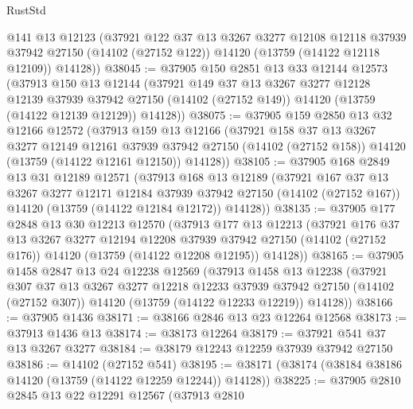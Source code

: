 \begin{lexlean}{RustStd}
\begin{coremodule}
      @141
      @13
      @12123
      (@37921
        @122
        @37
        @13
        @3267
        @3277
        @12108
        @12118
        @37939
        @37942
        @27150
        (@14102 (@27152 @122))
        @14120
        (@13759 (@14122 @12118 @12109))
        @14128))
@38045 := @37905
    @150
    @2851
    @13
    @33
    @12144
    @12573
    (@37913
      @150
      @13
      @12144
      (@37921
        @149
        @37
        @13
        @3267
        @3277
        @12128
        @12139
        @37939
        @37942
        @27150
        (@14102 (@27152 @149))
        @14120
        (@13759 (@14122 @12139 @12129))
        @14128))
@38075 := @37905
    @159
    @2850
    @13
    @32
    @12166
    @12572
    (@37913
      @159
      @13
      @12166
      (@37921
        @158
        @37
        @13
        @3267
        @3277
        @12149
        @12161
        @37939
        @37942
        @27150
        (@14102 (@27152 @158))
        @14120
        (@13759 (@14122 @12161 @12150))
        @14128))
@38105 := @37905
    @168
    @2849
    @13
    @31
    @12189
    @12571
    (@37913
      @168
      @13
      @12189
      (@37921
        @167
        @37
        @13
        @3267
        @3277
        @12171
        @12184
        @37939
        @37942
        @27150
        (@14102 (@27152 @167))
        @14120
        (@13759 (@14122 @12184 @12172))
        @14128))
@38135 := @37905
    @177
    @2848
    @13
    @30
    @12213
    @12570
    (@37913
      @177
      @13
      @12213
      (@37921
        @176
        @37
        @13
        @3267
        @3277
        @12194
        @12208
        @37939
        @37942
        @27150
        (@14102 (@27152 @176))
        @14120
        (@13759 (@14122 @12208 @12195))
        @14128))
@38165 := @37905
    @1458
    @2847
    @13
    @24
    @12238
    @12569
    (@37913
      @1458
      @13
      @12238
      (@37921
        @307
        @37
        @13
        @3267
        @3277
        @12218
        @12233
        @37939
        @37942
        @27150
        (@14102 (@27152 @307))
        @14120
        (@13759 (@14122 @12233 @12219))
        @14128))
@38166 := @37905 @1436
@38171 := @38166 @2846 @13 @23 @12264 @12568
@38173 := @37913 @1436 @13
@38174 := @38173 @12264
@38179 := @37921 @541 @37 @13 @3267 @3277
@38184 := @38179 @12243 @12259 @37939 @37942 @27150
@38186 := @14102 (@27152 @541)
@38195 := @38171 (@38174 (@38184 @38186 @14120 (@13759 (@14122 @12259 @12244)) @14128))
@38225 := @37905
    @2810
    @2845
    @13
    @22
    @12291
    @12567
    (@37913
      @2810

\end{coremodule}
\end{lexlean}
